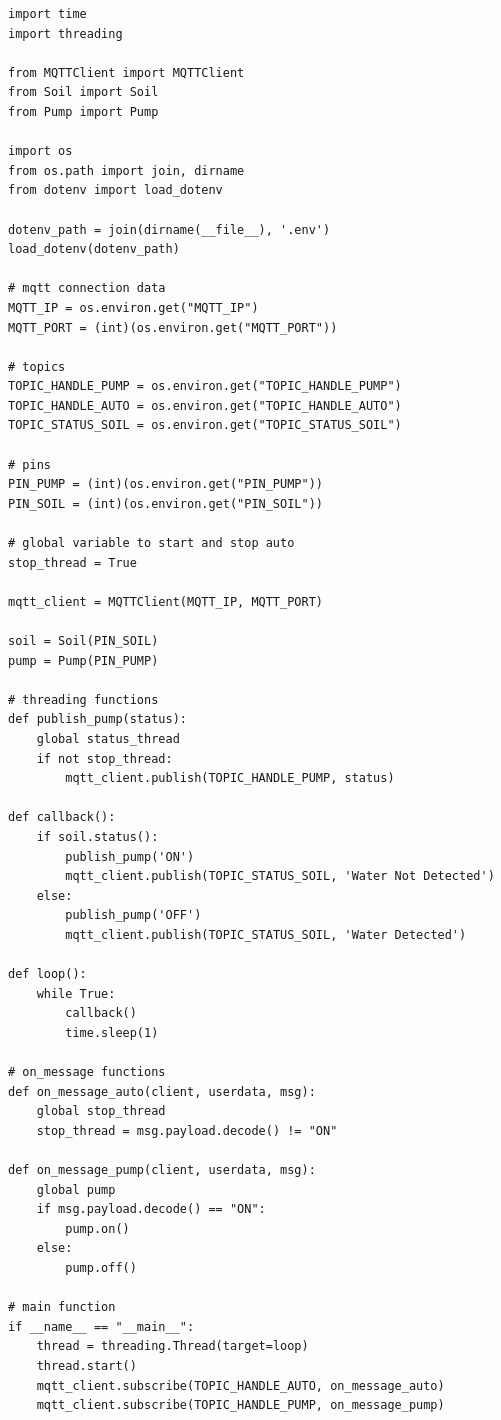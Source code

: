\begin{lstlisting}[caption=main.py, label=code:main.py]
import time
import threading

from MQTTClient import MQTTClient
from Soil import Soil
from Pump import Pump

import os
from os.path import join, dirname
from dotenv import load_dotenv

dotenv_path = join(dirname(__file__), '.env')
load_dotenv(dotenv_path)

# mqtt connection data
MQTT_IP = os.environ.get("MQTT_IP")
MQTT_PORT = (int)(os.environ.get("MQTT_PORT"))

# topics
TOPIC_HANDLE_PUMP = os.environ.get("TOPIC_HANDLE_PUMP")
TOPIC_HANDLE_AUTO = os.environ.get("TOPIC_HANDLE_AUTO")
TOPIC_STATUS_SOIL = os.environ.get("TOPIC_STATUS_SOIL")

# pins
PIN_PUMP = (int)(os.environ.get("PIN_PUMP"))
PIN_SOIL = (int)(os.environ.get("PIN_SOIL"))

# global variable to start and stop auto
stop_thread = True

mqtt_client = MQTTClient(MQTT_IP, MQTT_PORT)

soil = Soil(PIN_SOIL)
pump = Pump(PIN_PUMP)

# threading functions
def publish_pump(status):
    global status_thread
    if not stop_thread:
        mqtt_client.publish(TOPIC_HANDLE_PUMP, status)

def callback():
    if soil.status():
        publish_pump('ON')
        mqtt_client.publish(TOPIC_STATUS_SOIL, 'Water Not Detected')
    else:
        publish_pump('OFF')
        mqtt_client.publish(TOPIC_STATUS_SOIL, 'Water Detected')

def loop():
    while True:
        callback()
        time.sleep(1)

# on_message functions
def on_message_auto(client, userdata, msg):
    global stop_thread
    stop_thread = msg.payload.decode() != "ON"

def on_message_pump(client, userdata, msg):
    global pump
    if msg.payload.decode() == "ON":
        pump.on()
    else:
        pump.off()

# main function
if __name__ == "__main__":
    thread = threading.Thread(target=loop)
    thread.start()
    mqtt_client.subscribe(TOPIC_HANDLE_AUTO, on_message_auto)
    mqtt_client.subscribe(TOPIC_HANDLE_PUMP, on_message_pump)
\end{lstlisting}

